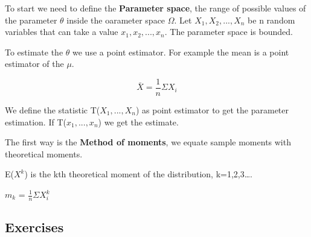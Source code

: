 \vspace{10pt}

To start we need to define the \textbf{Parameter space}, the range of possible values of the parameter $\theta$ inside the oarameter space $\Omega$.
Let $X_1, X_2, ..., X_n$ be n random variables that can take a value $x_1, x_2, ..., x_n$.
The parameter space is bounded.

\vspace{10pt}

To estimate the $\theta$ we use a point estimator. For example the mean is a point estimator of the $\mu$.

\begin{equation}
    \bar{X} = \frac{1}{n} \Sigma X_i
\end{equation}

We define the statistic T($X_1, ..., X_n$) as point estimator to get the parameter estimation.
If T($x_1, ..., x_n$) we get the estimate.


\vspace{10pt}

The first way is the \textbf{Method of moments}, we equate sample moments with theoretical moments.

E($X^k$) is the kth theoretical moment of the distribution, k=1,2,3\dots.

$m_k$ = $ \frac{1}{n} \Sigma X_i^k$

























\subsection{Exercises}  


